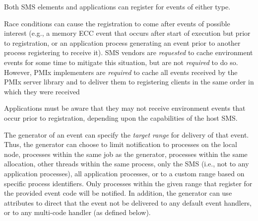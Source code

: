 Both \ac{SMS} elements and applications can register for events of either type.

\adviceimplstart
Race conditions can cause the registration to come after events of possible interest (e.g., a memory \ac{ECC} event that occurs after start of execution but prior to registration, or an application process generating an event prior to another process registering to receive it). \ac{SMS} vendors are \textit{requested} to cache environment events for some time to mitigate this situation, but are not \textit{required} to do so. However, \ac{PMIx} implementers are \textit{required} to cache all events received by the \ac{PMIx} server library and to deliver them to registering clients in the same order in which they were received
\adviceimplend

\adviceuserstart
Applications must be aware that they may not receive environment events that occur prior to registration, depending upon the capabilities of the host \ac{SMS}.
\adviceuserend

The generator of an event can specify the \textit{target range} for delivery of that event. Thus, the generator can choose to limit notification to processes on the local node, processes within the same job as the generator, processes within the same allocation, other threads within the same process, only the \ac{SMS} (i.e., not to any application processes), all application processes, or to a custom range based on specific process identifiers. Only processes within the given range that register for the provided event code will be notified. In addition, the generator can use attributes to direct that the event not be delivered to any default event handlers, or to any multi-code handler (as defined below).

